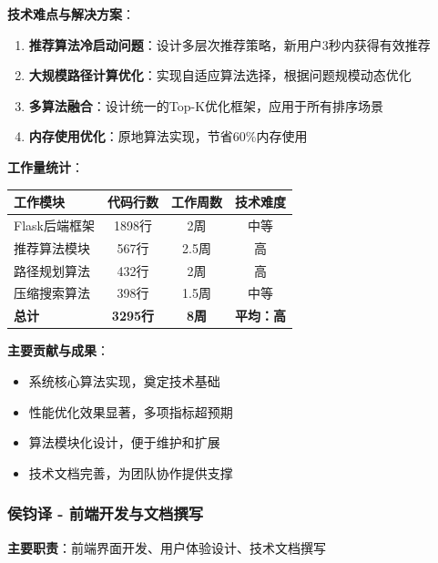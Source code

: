 \documentclass[12pt,a4paper]{article}
\begin{document}
\textbf{技术难点与解决方案}：
\begin{enumerate}
    \item \textbf{推荐算法冷启动问题}：设计多层次推荐策略，新用户3秒内获得有效推荐
    \item \textbf{大规模路径计算优化}：实现自适应算法选择，根据问题规模动态优化
    \item \textbf{多算法融合}：设计统一的Top-K优化框架，应用于所有排序场景
    \item \textbf{内存使用优化}：原地算法实现，节省60\%内存使用
\end{enumerate}

\textbf{工作量统计}：
\begin{center}
\begin{tabular}{|l|c|c|c|}
\hline
\textbf{工作模块} & \textbf{代码行数} & \textbf{工作周数} & \textbf{技术难度} \\
\hline
Flask后端框架 & 1898行 & 2周 & 中等 \\
推荐算法模块 & 567行 & 2.5周 & 高 \\
路径规划算法 & 432行 & 2周 & 高 \\
压缩搜索算法 & 398行 & 1.5周 & 中等 \\
\hline
\textbf{总计} & \textbf{3295行} & \textbf{8周} & \textbf{平均：高} \\
\hline
\end{tabular}
\end{center}

\textbf{主要贡献与成果}：
\begin{itemize}
    \item 系统核心算法实现，奠定技术基础
    \item 性能优化效果显著，多项指标超预期
    \item 算法模块化设计，便于维护和扩展
    \item 技术文档完善，为团队协作提供支撑
\end{itemize}

\subsubsection{侯钧译 - 前端开发与文档撰写}
\textbf{主要职责}：前端界面开发、用户体验设计、技术文档撰写
\end{document}
